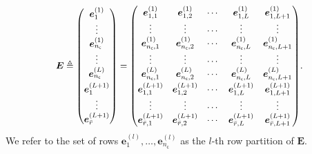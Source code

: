 \documentclass[twocolumn,conference]{IEEEtran}
\newcommand*{\Scale}[2][4]{\scalebox{#1}{\ensuremath{#2}}}%
\newcommand{\eqdef}{\triangleq}              %
\begin{document}
\begin{align*}
\Scale[0.95]{
  \bm E\eqdef\left(\begin{matrix}
      \bm e_1^{(1)}\\
      \vdots\\
      \bm e_{n_\mathsf{c}}^{(1)}\\
      \vdots\\
      \bm e_{n_\mathsf{c}}^{(L)}\\[1mm]
      \bm e_{1}^{(L+1)}\\
      \vdots\\
      \bm e_{\bar r}^{(L+1)}
    \end{matrix}\right)=\left(\begin{matrix}
      \bm e^{(1)}_{1,1} & \bm e^{(1)}_{1,2} & \cdots & \bm e^{(1)}_{1,L} & \bm e^{(1)}_{1,L+1}\\
      \vdots  & \vdots  & \cdots & \vdots & \vdots\\
      \bm e^{(1)}_{n_\mathsf{c},1} & \bm e^{(1)}_{n_\mathsf{c},2} & \cdots & \bm e^{(1)}_{n_\mathsf{c},L} & \bm e^{(1)}_{n_\mathsf{c},L+1}\\
      \vdots  & \vdots  & \cdots & \vdots & \vdots\\
      \bm e^{(L)}_{n_\mathsf{c},1} & \bm e^{(L)}_{n_\mathsf{c},2} & \cdots & \bm e^{(L)}_{n_\mathsf{c},L} & \bm e^{(L)}_{n_\mathsf{c},L+1}\\[1mm]
      \bm e^{(L+1)}_{1,1} & \bm e^{(L+1)}_{1,2} & \cdots & \bm e^{(L+1)}_{1,L} & \bm e^{(L+1)}_{1,L+1}\\
      \vdots  & \vdots  & \cdots & \vdots & \vdots\\
      \bm e^{(L+1)}_{\bar r,1} & \bm e^{(L+1)}_{\bar r,2} & \cdots & \bm e^{(L+1)}_{\bar r,L} & \bm e^{(L+1)}_{\bar r,L+1}
    \end{matrix}\right)}.
\end{align*}
We refer to the set of rows $\bm e_1^{(l)},\ldots, \bm e_{n_\mathsf{c}}^{(l)}$ as the $l$-th row partition of $\bm E$.
\end{document}
